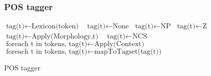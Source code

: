 \documentclass{beamer}
\begin{document}
\begin{frame}
\frametitle{POS tagger}
\begin{algorithm}[H]
\begin{scriptsize}
    \begin{algorithmic}[1]
	 	 $\text{tag(t)} \gets \text{Lexicon(token)}$ \Else $\text{ tag(t)}  \gets \text{None}$ \EndIf 
            \EndFor   
      $\text{tag(t)} \gets \text{NP}$  $\text{tag(t)} \gets \text{Z}$  $\text{tag(t)} \gets \text{Apply(Morphology,t)}$ 
     \Else $ \text{ tag(t)} \gets \text{NCS}$ \EndIf 
    \EndFor 
      $\text{foreach t in tokens, tag(t)} \gets \text{Apply(Context)}$ \EndIf  
      $\text{foreach t in tokens, tag(t)} \gets \text{mapToTagset(tag(t))}$ \EndIf       
        \EndProcedure
    \end{algorithmic}
    \label{alg:rAP}
    \caption{POS tagger}
    \end{scriptsize}
\end{algorithm}
\end{frame}
\end{document}
